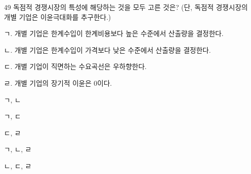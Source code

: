 \begin{question}{49}
독점적 경쟁시장의 특성에 해당하는 것을 모두 고른 것은? (단, 독점적 경쟁시장의 개별 기업은 이윤극대화를 추구한다.)
\begin{framedtext}
ㄱ. 개별 기업은 한계수입이 한계비용보다 높은 수준에서 산출량을 결정한다. \par
ㄴ. 개별 기업은 한계수입이 가격보다 낮은 수준에서 산출량을 결정한다. \par
ㄷ. 개별 기업이 직면하는 수요곡선은 우하향한다. \par
ㄹ. 개별 기업의 장기적 이윤은 0이다. \par
\end{framedtext}
\begin{choices}
  \item ㄱ, ㄴ
  \item ㄱ, ㄷ
  \item ㄷ, ㄹ
  \item ㄱ, ㄴ, ㄹ
  \item ㄴ, ㄷ, ㄹ
\end{choices}
\end{question}
